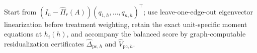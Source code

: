 Start from \((I_n-\widehat\Pi_r(A))(q_{1,h},\ldots,q_{n,h})^\top\); use leave-one-edge-out eigenvector linearization before treatment weighting, retain the exact unit-specific moment equations at \(h_i(h)\), and accompany the balanced score by graph-computable residualization certificates \(\widehat\Delta_{\mathrm{pc},h}\) and \(\widehat V_{\mathrm{pc},h}\).